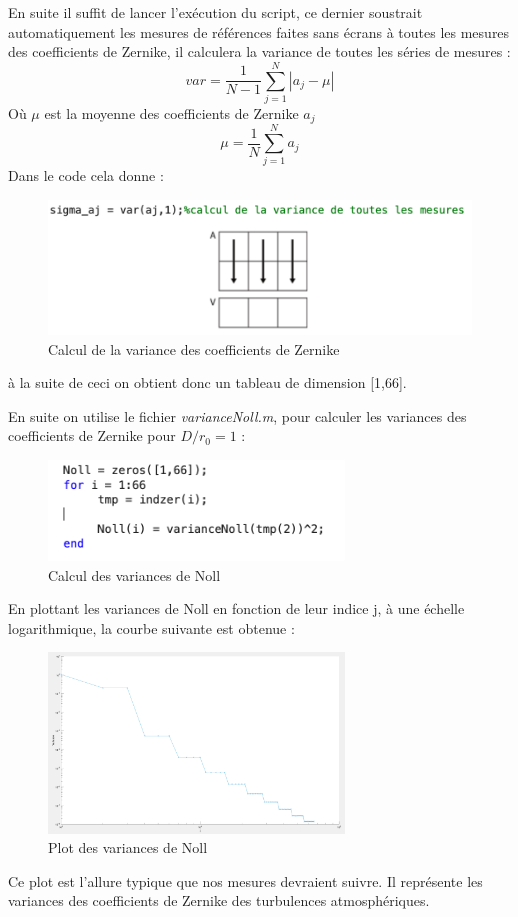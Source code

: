 En suite il suffit de lancer l'exécution du script, ce dernier soustrait automatiquement les mesures de références
faites sans écrans à toutes les mesures des coefficients de Zernike, il calculera la variance de toutes les séries de mesures :
\begin{equation}
    var = \frac{1}{N-1}\sum_{j=1}^{N}|a_j - \mu|
\end{equation}
Où $\mu$ est la moyenne des coefficients de Zernike $a_j$
\begin{equation}
    \mu = \frac{1}{N}\sum_{j=1}^{N}a_j
\end{equation}
Dans le code cela donne :
\begin{figure}[H]
    \centering
    \includegraphics[width = 1\textwidth]{assets/figures/mesures/variance_matlab.png}
    \caption{Calcul de la variance des coefficients de Zernike}
\end{figure}
à la suite de ceci on obtient donc un tableau de dimension [1,66].

\newpage
En suite on utilise le fichier \textit{varianceNoll.m}, pour calculer les variances des coefficients de Zernike
pour $D/r_0 = 1$ :
\begin{figure}[H]
    \centering
    \includegraphics[width = 0.7\textwidth]{assets/figures/mesures/Calcul_variance_nool.png}
    \caption{Calcul des variances de Noll}
\end{figure}
En plottant les variances de Noll en fonction de leur indice j, à une échelle logarithmique, la courbe suivante est obtenue :
\begin{figure}[H]
    \centering
    \includegraphics[width = 0.7\textwidth]{assets/figures/mesures/plot_variance_Noll.png}
    \caption{Plot des variances de Noll}
\end{figure}
Ce plot est l'allure typique que nos mesures devraient suivre. Il représente les variances des coefficients de Zernike
des turbulences atmosphériques.

